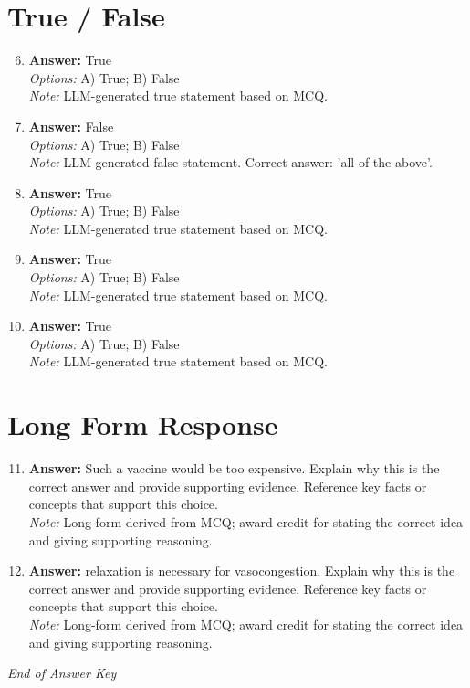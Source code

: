 \documentclass[12pt]{article}
\begin{document}
\section*{True / False}
\begin{enumerate}[label=\arabic*.]
\setcounter{enumi}{5}
\item \textbf{Answer:} True
\\ \textit{Options:} A) True; B) False
\\ \textit{Note:} LLM-generated true statement based on MCQ.
\item \textbf{Answer:} False
\\ \textit{Options:} A) True; B) False
\\ \textit{Note:} LLM-generated false statement. Correct answer: 'all of the above'.
\item \textbf{Answer:} True
\\ \textit{Options:} A) True; B) False
\\ \textit{Note:} LLM-generated true statement based on MCQ.
\item \textbf{Answer:} True
\\ \textit{Options:} A) True; B) False
\\ \textit{Note:} LLM-generated true statement based on MCQ.
\item \textbf{Answer:} True
\\ \textit{Options:} A) True; B) False
\\ \textit{Note:} LLM-generated true statement based on MCQ.
\end{enumerate}

\section*{Long Form Response}
\begin{enumerate}[label=\arabic*.]
\setcounter{enumi}{10}
\item \textbf{Answer:} Such a vaccine would be too expensive. Explain why this is the correct answer and provide supporting evidence. Reference key facts or concepts that support this choice.
\\ \textit{Note:} Long-form derived from MCQ; award credit for stating the correct idea and giving supporting reasoning.
\item \textbf{Answer:} relaxation is necessary for vasocongestion. Explain why this is the correct answer and provide supporting evidence. Reference key facts or concepts that support this choice.
\\ \textit{Note:} Long-form derived from MCQ; award credit for stating the correct idea and giving supporting reasoning.
\end{enumerate}

\vfill
\noindent\textit{End of Answer Key}
\end{document}

